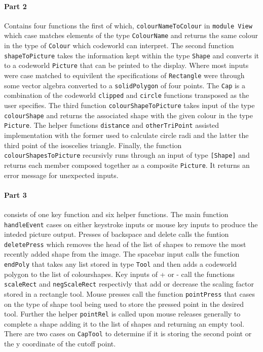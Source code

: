 \documentclass[11pt]{article}
\begin{document}
\paragraph{Part 2} Contains four functions the first of which, \verb|colourNameToColour| in \verb|module View| which case matches elements of the type \verb|ColourName| and returns the same colour in the type of \verb|Colour| which codeworld can interpret. The second function \verb|shapeToPicture| takes the information kept within the type \verb|Shape| and converts it to a codeworld \verb|Picture| that can be printed to the display. Where most inputs were case matched to equivilent the specifications of \verb|Rectangle| were through some vector algebra converted to a \verb|solidPolygon| of four points. The \verb|Cap| is a combination of the codeworld \verb|clipped| and \verb|circle| functions transposed as the user specifies. The third function \verb|colourShapeToPicture| takes input of the type \verb|colourShape| and returns the associated shape with the given colour in the type \verb|Picture|. The helper functions \verb|distance| and \verb|otherTriPoint| assisted implementation with the former used to calculate circle radi and the latter the third point of the isoscelies triangle. Finally, the function \verb|colourShapesToPicture| recursivly runs through an input of type \verb|[Shape]| and returns each member composed together as a composite \verb|Picture|. It returns an error message for unexpected inputs.

\paragraph{Part 3} consists of one key function and six helper functions. The main function \verb|handleEvent| cases on either keystroke inputs or mouse key inputs to produce the inteded picture output. Presses of backspace and delete calls the funtion \verb|deletePress| which removes the head of the list of shapes to remove the most recently added shape from the image. The spacebar input calls the function \verb|endPoly| that takes any list stored in type \verb|Tool| and then adds a codeworld polygon to the list of colourshapes. Key inputs of + or - call the functions \verb|scaleRect| and \verb|negScaleRect| respectivly that add or decrease the scaling factor stored in a rectangle tool. Mouse presses call the function \verb|pointPress| that cases on the type of shape tool being used to store the pressed point in the desired tool. Further the helper \verb|pointRel| is called upon mouse releases generally to complete a shape adding it to the list of shapes and returning an empty tool. There are two cases on \verb|CapTool| to determine if it is storing the second point or the y coordinate of the cutoff point.
\end{document}
